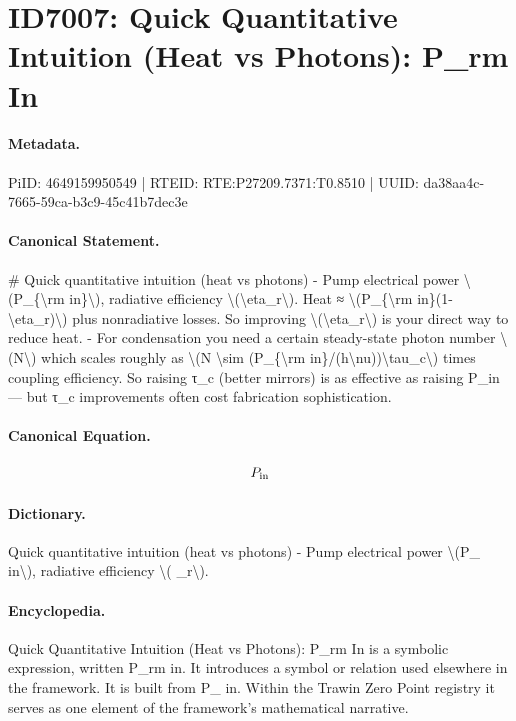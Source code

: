 \section*{ID7007: Quick Quantitative Intuition (Heat vs Photons): P\_rm In}
\paragraph{Metadata.}
PiID: 4649159950549 | RTEID: RTE:P27209.7371:T0.8510 | UUID: da38aa4c-7665-59ca-b3c9-45c41b7dec3e

\paragraph{Canonical Statement.}
\# Quick quantitative intuition (heat vs photons) - Pump electrical power \textbackslash{}(P\_\{\textbackslash{}rm in\}\textbackslash{}), radiative efficiency \textbackslash{}(\textbackslash{}eta\_r\textbackslash{}). Heat ≈ \textbackslash{}(P\_\{\textbackslash{}rm in\}(1-\textbackslash{}eta\_r)\textbackslash{}) plus nonradiative losses. So improving \textbackslash{}(\textbackslash{}eta\_r\textbackslash{}) is your direct way to reduce heat. - For condensation you need a certain steady-state photon number \textbackslash{}(N\textbackslash{}) which scales roughly as \textbackslash{}(N \textbackslash{}sim (P\_\{\textbackslash{}rm in\}/(h\textbackslash{}nu))\textbackslash{}tau\_c\textbackslash{}) times coupling efficiency. So raising τ\_c (better mirrors) is as effective as raising P\_in — but τ\_c improvements often cost fabrication sophistication.

\paragraph{Canonical Equation.}
\[
P_{\rm in}
\]

\paragraph{Dictionary.}
Quick quantitative intuition (heat vs photons) - Pump electrical power \textbackslash{}(P\_ in\textbackslash{}), radiative efficiency \textbackslash{}( \_r\textbackslash{}).

\paragraph{Encyclopedia.}
Quick Quantitative Intuition (Heat vs Photons): P\_rm In is a symbolic expression, written P\_rm in. It introduces a symbol or relation used elsewhere in the framework. It is built from P\_ in. Within the Trawin Zero Point registry it serves as one element of the framework's mathematical narrative.
